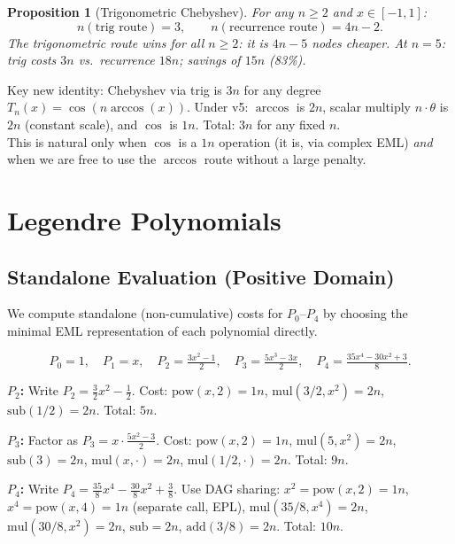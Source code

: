 \documentclass[11pt,a4paper]{article}
\newtheorem{proposition}[theorem]{Proposition}
\begin{document}
\begin{proposition}[Trigonometric Chebyshev]
\label{prop:cheb_trig}
  For any $n \geq 2$ and $x \in [-1, 1]$:
  \[
    n(\text{trig route}) = 3, \qquad n(\text{recurrence route}) = 4n - 2.
  \]
  The trigonometric route wins for all $n \geq 2$: it is $4n - 5$ nodes cheaper.
  At $n = 5$: trig costs $3n$ vs.\ recurrence $18n$; savings of $15n$ (83\%).
\end{proposition}

\begin{findingbox}{Key new identity: Chebyshev via trig is $3n$ for any degree}
  $T_n(x) = \cos(n \arccos(x))$. Under v5: $\arccos$ is $2n$, scalar multiply $n \cdot \theta$
  is $2n$ (constant scale), and $\cos$ is $1n$. Total: $3n$ for any fixed $n$. \\
  This is natural only when $\cos$ is a $1n$ operation (it is, via complex EML) \emph{and}
  when we are free to use the $\arccos$ route without a large penalty.
\end{findingbox}

\section{Legendre Polynomials}

\subsection{Standalone Evaluation (Positive Domain)}

We compute standalone (non-cumulative) costs for $P_0$--$P_4$ by choosing the minimal
EML representation of each polynomial directly.

\[
  P_0 = 1, \quad P_1 = x, \quad P_2 = \tfrac{3x^2-1}{2}, \quad
  P_3 = \tfrac{5x^3-3x}{2}, \quad P_4 = \tfrac{35x^4-30x^2+3}{8}.
\]

\textbf{$P_2$:} Write $P_2 = \tfrac{3}{2} x^2 - \tfrac{1}{2}$.
Cost: $\mathrm{pow}(x,2) = 1n$, $\mathrm{mul}(3/2, x^2) = 2n$,
$\mathrm{sub}(1/2) = 2n$. Total: $5n$.

\textbf{$P_3$:} Factor as $P_3 = x \cdot \tfrac{5x^2-3}{2}$.
Cost: $\mathrm{pow}(x,2) = 1n$, $\mathrm{mul}(5, x^2) = 2n$,
$\mathrm{sub}(3) = 2n$, $\mathrm{mul}(x, \cdot) = 2n$, $\mathrm{mul}(1/2, \cdot) = 2n$.
Total: $9n$.

\textbf{$P_4$:} Write $P_4 = \tfrac{35}{8} x^4 - \tfrac{30}{8} x^2 + \tfrac{3}{8}$.
Use DAG sharing: $x^2 = \mathrm{pow}(x,2) = 1n$, $x^4 = \mathrm{pow}(x,4) = 1n$ (separate
call, EPL), $\mathrm{mul}(35/8, x^4) = 2n$, $\mathrm{mul}(30/8, x^2) = 2n$,
$\mathrm{sub} = 2n$, $\mathrm{add}(3/8) = 2n$. Total: $10n$.
\end{document}
